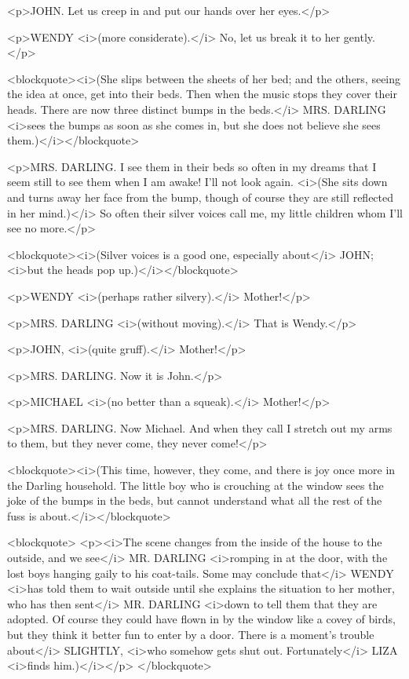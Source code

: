 <p>JOHN. Let us creep in and put our hands over her eyes.</p>

<p>WENDY <i>(more considerate).</i> No, let us break it to her
gently.</p>

<blockquote><i>(She slips between the sheets of her bed; and the
others, seeing the idea at once, get into their beds. Then when the
music stops they cover their heads. There are now three distinct
bumps in the beds.</i> MRS. DARLING <i>sees the bumps as soon as she
comes in, but she does not believe she sees them.)</i></blockquote>

<p>MRS. DARLING. I see them in their beds so often in my dreams that
I seem still to see them when I am awake! I'll not look again.
<i>(She sits down and turns away her face from the bump, though of
course they are still reflected in her mind.)</i> So often their
silver voices call me, my little children whom I'll see no more.</p>

<blockquote><i>(Silver voices is a good one, especially about</i>
JOHN; <i>but the heads pop up.)</i></blockquote>

<p>WENDY <i>(perhaps rather silvery).</i> Mother!</p>

<p>MRS. DARLING <i>(without moving).</i> That is Wendy.</p>

<p>JOHN, <i>(quite gruff).</i> Mother!</p>

<p>MRS. DARLING. Now it is John.</p>

<p>MICHAEL <i>(no better than a squeak).</i> Mother!</p>

<p>MRS. DARLING. Now Michael. And when they call I stretch out my
arms to them, but they never come, they never come!</p>

<blockquote><i>(This time, however, they come, and there is joy once
more in the Darling household. The little boy who is crouching at the
window sees the joke of the bumps in the beds, but cannot understand
what all the rest of the fuss is about.</i></blockquote>

<blockquote>
<p><i>The scene changes from the inside of the house to the outside,
and we see</i> MR. DARLING <i>romping in at the door, with the lost
boys hanging gaily to his coat-tails. Some may conclude that</i>
WENDY <i>has told them to wait outside until she explains the
situation to her mother, who has then sent</i> MR. DARLING <i>down to
tell them that they are adopted. Of course they could have flown in
by the window like a covey of birds, but they think it better fun to
enter by a door. There is a moment's trouble about</i> SLIGHTLY,
<i>who somehow gets shut out. Fortunately</i> LIZA <i>finds
him.)</i></p>
</blockquote>

